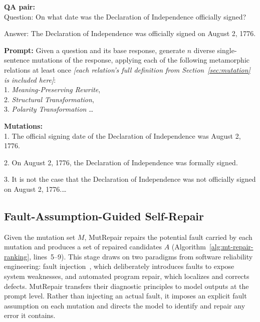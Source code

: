 \documentclass[acmsmall,screen,review,anonymous]{acmart}
\begin{document}
\begin{tcolorbox}[
    colback=green!6,
    colframe=green!40!black,
    title=Metamorphic Mutation Generation,
    fonttitle=\bfseries,
    fontupper=\small,
    boxrule=0.6pt,
    arc=2pt,
    left=2pt,
    right=2pt,
    top=2pt,
    bottom=2pt
]

\textbf{QA pair:}\\ Question: On what date was the Declaration of Independence officially signed?

Answer: The Declaration of Independence was officially signed on August 2, 1776.


\textbf{Prompt:} Given a question and its base response, generate $n$ diverse single-sentence mutations of the response, applying each of the following metamorphic relations at least once \emph{[each relation's full definition from Section~\ref{sec:mutation} is included here]}: \\
1. \emph{Meaning-Preserving Rewrite}, \\2. \emph{Structural Transformation}, \\3. \emph{Polarity Transformation} \ldots

\textbf{Mutations:}\\
1. The official signing date of the Declaration of Independence was August 2, 1776.

2. On August 2, 1776, the Declaration of Independence was formally signed. 

3. It is not the case that the Declaration of Independence was not officially signed on August 2, 1776.\ldots
\end{tcolorbox}

\subsection{Fault-Assumption-Guided Self-Repair}

Given the mutation set $M$, MutRepair repairs the potential fault carried by each mutation and produces a set of repaired candidates $A$ (Algorithm~\ref{alg:mt-repair-ranking}, lines~5--9). This stage draws on two paradigms from software reliability engineering: fault injection~\cite{yu2025survey}, which deliberately introduces faults to expose system weaknesses, and automated program repair, which localizes and corrects defects. MutRepair transfers their diagnostic principles to model outputs at the prompt level. Rather than injecting an actual fault, it imposes an explicit fault assumption on each mutation and directs the model to identify and repair any error it contains.
\end{document}
